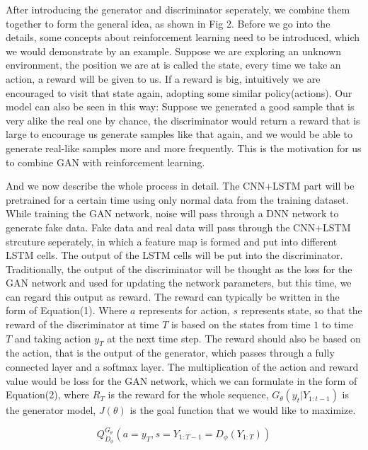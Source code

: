 \documentclass{acmtog} %
\begin{document}
After introducing the generator and discriminator seperately, we combine them together to form the general idea, as shown in Fig 2. Before we go into the details, some concepts about reinforcement learning need to be introduced, which we would demonstrate by an example. Suppose we are exploring an unknown environment, the position we are at is called the state, every time we take an action, a reward will be given to us. If a reward is big, intuitively we are encouraged to visit that state again, adopting some similar policy(actions). Our model can also be seen in this way: Suppose we generated a good sample that is very alike the real one by chance, the discriminator would return a reward that is large to encourage us generate samples like that again, and we would be able to generate real-like samples more and more frequently. This is the motivation for us to combine GAN with reinforcement learning. 

And we now describe the whole process in detail. The CNN+LSTM part will be pretrained for a certain time using only normal data from the training dataset. While training the GAN network, noise will pass through a DNN network to generate fake data. Fake data and real data will pass through the CNN+LSTM strcuture seperately, in which a feature map is formed and put into different LSTM cells. The output of the LSTM cells will be put into the discriminator. Traditionally, the output of the discriminator will be thought as the loss for the GAN network and used for updating the network parameters, but this time, we can regard this output as reward. The reward can typically be written in the form of Equation(1). Where $a$ represents for action, $s$ represents state, so that the reward of the discriminator at time $T$ is based on the states from time $1$ to time $T$ and taking action $y_T$ at the next time step. The reward should also be based on the action, that is the output of the generator, which passes through a fully connected layer and a softmax layer. The multiplication of the action and reward value would be loss for the GAN network, which we can formulate in the form of Equation(2), where $R_T$ is the reward for the whole sequence, $G_\theta(y_t|Y_{1:t-1})$ is the generator model, $J(\theta)$ is the goal function that we would like to maximize.

\begin{equation}
Q_{D_\phi}^{G_\theta}(a = y_T, s = Y_{1:T-1} = D_\phi(Y_{1:T}))
\label{eq:samplevar}
\end{equation}
\end{document}
